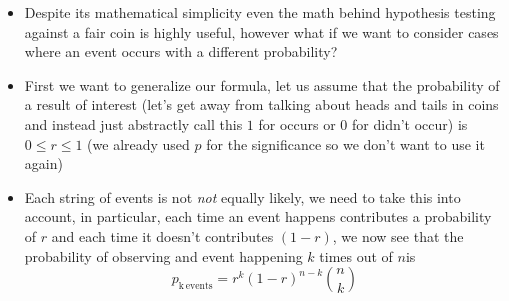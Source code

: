 \documentclass[english]{article}
\begin{document}
\begin{itemize}
\item Despite its mathematical simplicity even the math behind hypothesis testing against a fair coin is highly useful, however what if we want to consider cases where an event occurs with a different probability?
\item First we want to generalize our formula, let us assume that the probability of a result of interest (let's get away from talking about heads and tails in coins and instead just abstractly call this $1$ for occurs or $0$ for didn't occur) is $ 0 \le r\le1$ (we already used $p$ for the significance so we don't want to use it again)
\item Each string of events is not \emph{not} equally likely, we need to take this into account, in particular, each time an event happens contributes a probability of $r$ and each time it doesn't contributes $(1-r)$, we now see that the probability of observing and event happening $k$ times out of $n$is
\begin{equation}
p_{\mathrm{k\,events}}=r^k(1-r)^{n-k}\binom{n}{k}
\end{equation}
\end{itemize}
\end{document}
